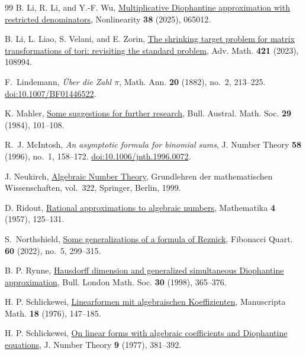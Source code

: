 \documentclass[11pt,reqno,a4paper]{amsart}
\theoremstyle{remark}
\begin{document}
\begin{thebibliography}{99}
B. Li, R. Li, and Y.-F. Wu,
\href{https://doi.org/10.1088/1361-6544/add833}{Multiplicative Diophantine approximation with restricted denominators},
Nonlinearity \textbf{38} (2025), 065012.

B. Li, L. Liao, S. Velani, and E. Zorin,
\href{https://doi.org/10.1016/j.aim.2023.108994}{The shrinking target problem for matrix transformations of tori: revisiting the standard problem},
Adv. Math. \textbf{421} (2023), 108994.

F.~Lindemann, \emph{\"Uber die Zahl \(\pi\)}, Math. Ann. \textbf{20}
(1882), no.~2, 213--225.
\href{https://doi.org/10.1007/BF01446522}{doi:10.1007/BF01446522}.

K. Mahler,
\href{https://doi.org/10.1017/S0004972700021316}{Some suggestions for further research},
Bull. Austral. Math. Soc. \textbf{29} (1984), 101--108.

R.~J. McIntosh, \emph{An asymptotic formula for binomial sums},
J. Number Theory \textbf{58} (1996), no.~1, 158--172.
\href{https://doi.org/10.1006/jnth.1996.0072}{doi:10.1006/jnth.1996.0072}.

J. Neukirch,
\href{https://doi.org/10.1007/978-3-662-03983-0}{Algebraic Number Theory},
Grundlehren der mathematischen Wissenschaften, vol.~322, Springer, Berlin, 1999.

D. Ridout,
\href{https://doi.org/10.1112/S0025579300001182}{Rational approximations to algebraic numbers},
Mathematika \textbf{4} (1957), 125--131.

S.~Northshield,
\href{https://www.mathstat.dal.ca/FQ/Papers1/60-5/northshield.pdf}{Some generalizations of a formula of Reznick},
Fibonacci Quart. \textbf{60} (2022), no.~5, 299--315.

B. P. Rynne,
\href{https://doi.org/10.1112/S0024609398004536}{Hausdorff dimension and generalized simultaneous Diophantine approximation},
Bull. London Math. Soc. \textbf{30} (1998), 365--376.

H. P. Schlickewei,
\href{https://gdz.sub.uni-goettingen.de/download/pdf/PPN365956996_0018/PPN365956996_0018.pdf}{Linearformen mit algebraischen Koeffizienten},
Manuscripta Math. \textbf{18} (1976), 147--185.

H. P. Schlickewei,
\href{https://doi.org/10.1016/0022-314X(77)90073-7}{On linear forms with algebraic coefficients and Diophantine equations},
J. Number Theory \textbf{9} (1977), 381--392.


\end{thebibliography}
\end{document}
